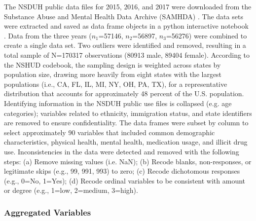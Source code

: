 \documentclass[sigconf]{acmart}
\begin{document}
The NSDUH public data files for 2015, 2016, and 2017 were downloaded from 
the Substance Abuse and Mental Health Data Archive (SAMHDA) \cite{samhsa18}. 
The data sets were extracted and saved as data frame objects in a python 
interactive notebook \cite{mckinney17, vanderplas17}. Data from the three
years ($n_1$=57146, $n_2$=56897, $n_3$=56276) were combined to create a 
single data set. Two outliers were identified and removed, resulting in a
total sample of N=170317 observations (80913 male, 89404 female). 
According to the NSHUD codebook, the sampling design is weighted across 
states by population size, drawing more heavily from eight states with 
the largest populations (i.e., CA, FL, IL, MI, NY, OH, PA, TX), for a 
representative distribution that accounts for approximately 48 percent 
of the U.S. population. Identifying information in the NSDUH public use files 
is collapsed (e.g. age categories); variables related to ethnicity, immigration 
status, and state identifiers are removed to ensure confidentiality. The data 
frames were subset by column to select approximately 90 variables that 
included common demographic characteristics, physical health, mental health, 
medication usage, and illicit drug use. Inconsistencies in the data were 
detected and removed with the following steps: (a) Remove missing values 
(i.e. NaN); (b) Recode blanks, non-responses, or legitimate skips 
(e.g., 99, 991, 993) to zero; (c) Recode dichotomous responses (e.g., 0=No, 
1=Yes); (d) Recode ordinal variables to be consistent with amount or 
degree (e.g., 1=low, 2=medium, 3=high). 


\subsubsection{Aggregated Variables}
\end{document}

